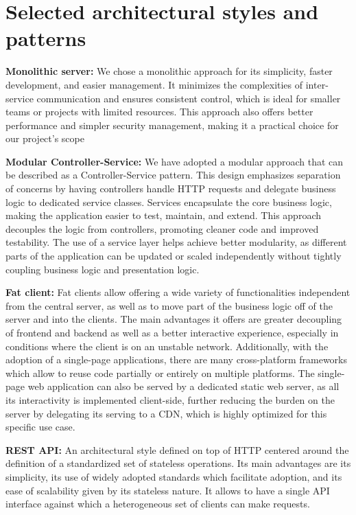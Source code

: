 \begin{itemize}
\newpage

\end{itemize}


\section{Selected architectural styles and patterns}
\textbf{Monolithic server:} 
We chose a monolithic approach for its simplicity, faster development, and easier management. It minimizes the complexities of inter-service communication and ensures consistent control, which is ideal for smaller teams or projects with limited resources. This approach also offers better performance and simpler security management, making it a practical choice for our project’s scope

\textbf{Modular Controller-Service:}
We have adopted a modular approach that can be described as a Controller-Service pattern. This design emphasizes separation of concerns by having controllers handle HTTP requests and delegate business logic to dedicated service classes. Services encapsulate the core business logic, making the application easier to test, maintain, and extend. This approach decouples the logic from controllers, promoting cleaner code and improved testability. The use of a service layer helps achieve better modularity, as different parts of the application can be updated or scaled independently without tightly coupling business logic and presentation logic.

\textbf{Fat client:}
Fat clients allow offering a wide variety of functionalities independent from the central server, as well as to move part of the business logic off of the server and into the clients. The main advantages it offers are greater decoupling of frontend and backend as well as a better interactive experience, especially in conditions where the client is on an unstable network. Additionally, with the adoption of a single-page applications, there are many cross-platform frameworks which allow to reuse code partially or entirely on multiple platforms. The single-page web application can also be served by a dedicated static web server, as all its interactivity is implemented client-side, further reducing the burden on the server by delegating its serving to a CDN, which is highly optimized for
this specific use case.

\textbf{REST API:}
An architectural style defined on top of HTTP centered around the definition of a standardized set of stateless operations. Its main advantages are its simplicity, its use of widely adopted standards which facilitate adoption, and its ease of scalability given by its stateless nature. It allows to have a single API interface against which a heterogeneous set of clients can make requests.

